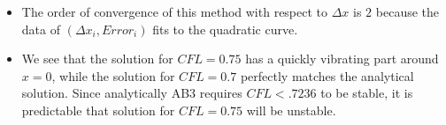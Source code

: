 \documentclass[11pt]{article}
\begin{document}
	\begin{itemize}
		\item The order of convergence of this method with respect to $\Delta x$ is $2$ because the data of $(\Delta x_i, Error_i)$ fits to the quadratic curve.
		\item We see that the solution for $CFL = 0.75$ has a quickly vibrating part around $x = 0$, while the solution for $CFL = 0.7$ perfectly matches the analytical solution. Since analytically AB3 requires $CFL < .7236$ to be stable, it is predictable that solution for $CFL = 0.75$ will be unstable.
	\end{itemize}
\end{document}
